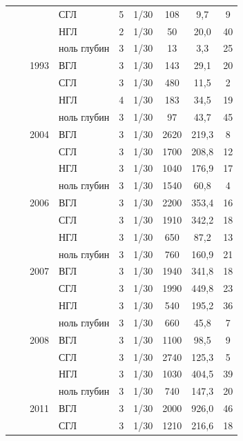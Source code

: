 \documentclass[12pt, a4paper]{disser}
\begin{document}
\begin{footnotesize}
\begin{longtable}{|p{2cm}|p{3cm}|p{1cm}|p{2cm}|p{1.5cm}|p{1cm}|*{3}{c|}}
		\\ \cline{4-9}
		 &  &  & СГЛ & 5 & 1/30 & 108 & 9,7 & 9
		\\ \cline{4-9}
		 &  &  & НГЛ & 2 & 1/30 & 50 & 20,0 & 40
		\\ \cline{4-9}
		 &  &  & ноль глубин & 3 & 1/30 & 13 & 3,3 & 25
		\\ \cline{3-9}
		 &  & 1993 & ВГЛ & 3 & 1/30 & 143 & 29,1 & 20
		\\ \cline{4-9}
		 &  &  & СГЛ & 3 & 1/30 & 480 & 11,5 & 2
		\\ \cline{4-9}
		 &  &  & НГЛ & 4 & 1/30 & 183 & 34,5 & 19
		\\ \cline{4-9}
		 &  &  & ноль глубин & 3 & 1/30 & 97 & 43,7 & 45
		\\ \cline{3-9}
		 &  & 2004 & ВГЛ & 3 & 1/30 & 2620 & 219,3 & 8
		\\ \cline{4-9}
		 &  &  & СГЛ & 3 & 1/30 & 1700 & 208,8 & 12
		\\ \cline{4-9}
		 &  &  & НГЛ & 3 & 1/30 & 1040 & 176,9 & 17
		\\ \cline{4-9}
		 &  &  & ноль глубин & 3 & 1/30 & 1540 & 60,8 & 4
		\\ \cline{3-9}
		 &  & 2006 & ВГЛ & 3 & 1/30 & 2200 & 353,4 & 16
		\\ \cline{4-9}
		 &  &  & СГЛ & 3 & 1/30 & 1910 & 342,2 & 18
		\\ \cline{4-9}
		 &  &  & НГЛ & 3 & 1/30 & 650 & 87,2 & 13
		\\ \cline{4-9}
		 &  &  & ноль глубин & 3 & 1/30 & 760 & 160,9 & 21
		\\ \cline{3-9}
		 &  & 2007 & ВГЛ & 3 & 1/30 & 1940 & 341,8 & 18
		\\ \cline{4-9}
		 &  &  & СГЛ & 3 & 1/30 & 1990 & 449,8 & 23
		\\ \cline{4-9}
		 &  &  & НГЛ & 3 & 1/30 & 540 & 195,2 & 36
		\\ \cline{4-9}
		 &  &  & ноль глубин & 3 & 1/30 & 660 & 45,8 & 7
		\\ \cline{3-9}
		 &  & 2008 & ВГЛ & 3 & 1/30 & 1100 & 98,5 & 9
		\\ \cline{4-9}
		 &  &  & СГЛ & 3 & 1/30 & 2740 & 125,3 & 5
		\\ \cline{4-9}
		 &  &  & НГЛ & 3 & 1/30 & 1030 & 404,5 & 39
		\\ \cline{4-9}
		 &  &  & ноль глубин & 3 & 1/30 & 740 & 147,3 & 20
		\\ \cline{3-9}
		 &  & 2011 & ВГЛ & 3 & 1/30 & 2000 & 926,0 & 46
		\\ \cline{4-9}
		 &  &  & СГЛ & 3 & 1/30 & 1210 & 216,6 & 18

\end{longtable}
\end{footnotesize}
\end{document}
